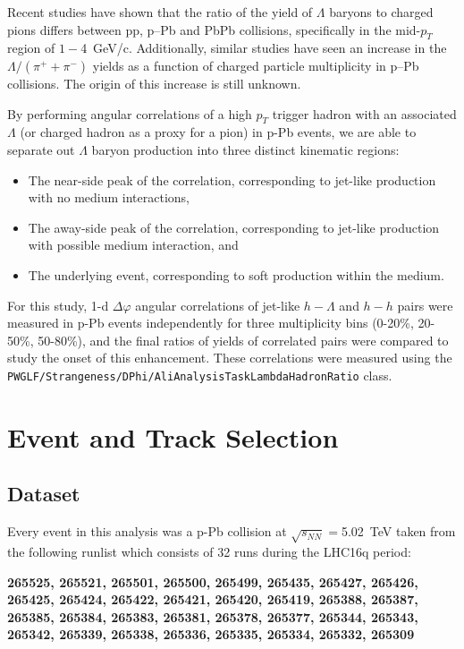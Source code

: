 \documentclass[ALICE,manyauthors]{ALICE_analysis_notes}
\begin{document}
Recent studies have shown that the ratio of the yield of $\Lambda$ baryons to charged pions differs between pp, p--Pb and PbPb collisions, specifically in the mid-$p_T$ region of $1-$\SI{4}{GeV/c}.  Additionally, similar studies have seen an increase in the $\Lambda/(\pi^{+} + \pi^{-})$ yields as a function of charged particle multiplicity in p--Pb collisions. The origin of this increase is still unknown.

By performing angular correlations of a high $p_T$ trigger hadron with an associated $\Lambda$ (or charged hadron as a proxy for a pion) in p-Pb events, we are able to separate out $\Lambda$ baryon production into three distinct kinematic regions:
\begin{itemize}
\item The near-side peak of the correlation, corresponding to jet-like production with no medium interactions,
\item The away-side peak of the correlation, corresponding to jet-like production with possible medium interaction, and
\item The underlying event, corresponding to soft production within the medium.
\end{itemize}

For this study, 1-d $\Delta\varphi$ angular correlations of jet-like $h-\Lambda$ and $h-h$ pairs were measured in p-Pb events independently for three multiplicity bins (0-20\%, 20-50\%, 50-80\%), and the final ratios of yields of correlated pairs were compared to study the onset of this enhancement. These correlations were measured using the \texttt{PWGLF/Strangeness/DPhi/AliAnalysisTaskLambdaHadronRatio} class.

\section{Event and Track Selection}

\subsection{Dataset}

Every event in this analysis was a p-Pb collision at $\sqrt{s_{NN}} =$\SI{5.02}{TeV} taken from the following runlist which consists of 32 runs during the LHC16q period:

\textbf{265525, 265521, 265501, 265500, 265499, 265435, 265427, 265426, 265425, 265424, 265422, 265421, 265420, 265419, 265388, 265387, 265385, 265384, 265383, 265381, 265378, 265377, 265344, 265343, 265342, 265339, 265338, 265336, 265335, 265334, 265332, 265309}
\end{document}
